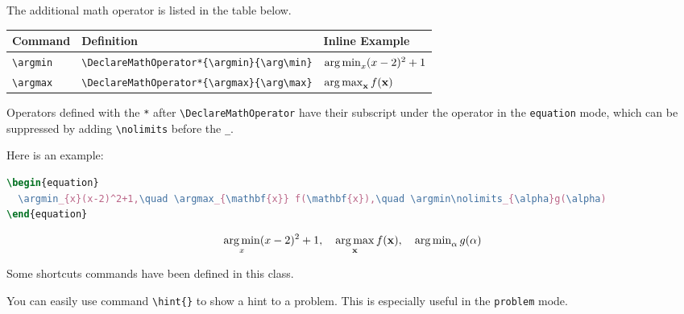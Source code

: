 \documentclass[oneside]{seu-ml-assign}
\newcommand{\grayrow}{\rowcolor[rgb]{ .906,  .902,  .902}}
\begin{document}
     The additional math operator is listed in the table below.
    \begin{table}[htbp]
      \begin{threeparttable}
        \bgroup
          \def\arraystretch{1.2}
          \setlength{\tabcolsep}{1.5em}
          \begin{tabular}{lll}
          \toprule
            \textbf{Command} & \textbf{Definition} & \textbf{Inline Example} \\
            \midrule\midrule
            \grayrow \verb|\argmin| & \verb|\DeclareMathOperator*{\argmin}{\arg\min}| & $\argmin_{x}(x-2)^2+1$ \\
            \verb|\argmax| & \verb|\DeclareMathOperator*{\argmax}{\arg\max}| & $\argmax_{\mathbf{x}} f(\mathbf{x})$ \\
          \bottomrule
          \end{tabular}%
          \begin{tablenotes}\footnotesize
            \item Operators defined with the \texttt{*} after \verb|\DeclareMathOperator| have their subscript under the operator in the \texttt{equation} mode, which can be suppressed by adding \verb|\nolimits| before the \verb|_|.
          \end{tablenotes}
        \egroup
      \end{threeparttable}
    \end{table}

    Here is an example:
    \begin{lstlisting}[language=tex,numbers=none,morekeywords={begin}]
\begin{equation}
  \argmin_{x}(x-2)^2+1,\quad \argmax_{\mathbf{x}} f(\mathbf{x}),\quad \argmin\nolimits_{\alpha}g(\alpha)
\end{equation}
    \end{lstlisting}
    \begin{equation}
      \argmin_{x}(x-2)^2+1,\quad \argmax_{\mathbf{x}} f(\mathbf{x}),\quad \argmin\nolimits_{\alpha}g(\alpha)
    \end{equation}

     Some shortcuts commands have been defined in this class.

      \label{subsubsec:hint}
      You can easily use command \verb|\hint{}| to show a hint to a problem.
      This is especially useful in the \texttt{problem} mode.
\end{document}
